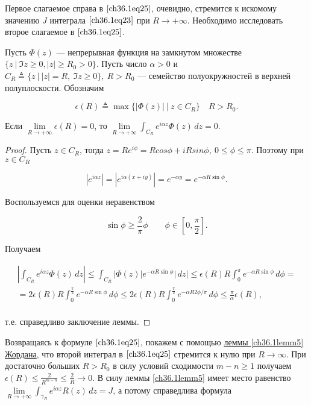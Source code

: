 Первое слагаемое справа в $\eqref{ch36.1eq25}$, очевидно, стремится к искомому значению $J$ интеграла $\eqref{ch36.1eq23}$ при $R \to +\infty$. Необходимо исследовать второе слагаемое в $\eqref{ch36.1eq25}$.

\begin{lemm} [Жордана] \label{ch36.1lemm5}
Пусть $\Phi(z)$ --- непрерывная функция на замкнутом множестве $\{ z \: \big| \: \Im z \ge 0, |z| \ge R_0 > 0 \}$. Пусть число $\alpha > 0$ и $C_R \triangleq \{ z \: \big| \: |z| = R, \: \Im z \ge 0 \}, \: R > R_0$ --- семейство полуокружностей в верхней полуплоскости. Обозначим

$$
\epsilon(R) \triangleq \max \{ |\Phi(z)| \: \big| \: z \in C_R \} \quad R > R_0.
$$

Если $\lim\limits_{R \to +\infty} \epsilon(R) = 0$, то $\lim\limits_{R \to +\infty} \int_{C_R} e^{i \alpha z} \Phi(z) \,dz = 0$.

\end{lemm}

\begin{proof}
Пусть $z \in C_R$, тогда $z = Re^{i\phi} = Rcos\phi + iRsin\phi, \: 0 \le \phi \le \pi$. Поэтому при $z \in C_R$

$$
|e^{i \alpha z}| = |e^{i \alpha(x + iy)}| = e^{-\alpha y} = e^{- \alpha R \sin\phi}.
$$

Воспользуемся для оценки неравенством

\begin{equation} \label{ch36.1eq26}
\sin \phi \ge \frac{2}{\pi}\phi \quad \text{} \quad \phi \in \left[ 0, \frac{\pi}{2}\right].
\end{equation}

Получаем

\begin{multline*}
\left| \int_{C_R} e^{i \alpha z} \Phi(z)\,dz \right| \le \int_{C_R} |\Phi(z)|e^{-\alpha R \sin \phi}|\,dz| \le \epsilon(R)R \int_0^\pi e^{-\alpha R \sin\phi} \,d\phi =\\= 2\epsilon(R)R \int_0^{\frac{\pi}{2}} e^{-\alpha R \sin\phi} \,d\phi \le 2\epsilon(R)R \int_0^{\frac{\pi}{2}} e^{-\alpha R 2\phi / \pi} \,d\phi \le \frac{\pi}{\alpha} \epsilon(R),\\
\end{multline*}

т.е. справедливо заключение леммы.
\end{proof}

Возвращаясь к формуле $\eqref{ch36.1eq25}$, покажем с помощью \hyperref[ch36.1lemm5]{леммы \ref{ch36.1lemm5} Жордана}, что второй интеграл в $\eqref{ch36.1eq25}$ стремится к нулю при $R \to \infty$. При достаточно больших $R > R_0$ в силу условий сходимости $m - n \ge 1$ получаем $\epsilon(R) \le \frac{2}{R^{m - n}} \le \frac{2}{R} \to 0$. В силу леммы  \ref{ch36.1lemm5} имеет место равенство $\lim\limits_{R \to +\infty} \int_{\gamma_R} e^{i \alpha z}R(z) \,dz = J$, а потому справедлива формула

